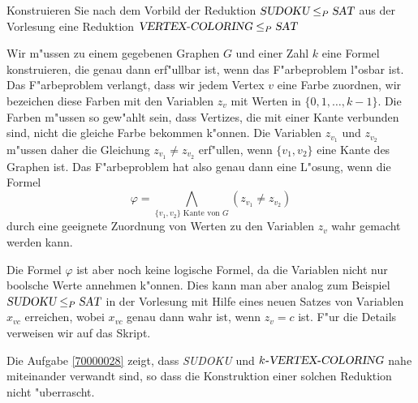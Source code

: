 Konstruieren Sie nach dem Vorbild der Reduktion
$\textsl{SUDOKU}\le_P\textsl{SAT}$ aus der Vorlesung eine
Reduktion
$\textsl{VERTEX-COLORING}\le_P\textsl{SAT}$

\begin{loesung}
Wir m"ussen zu einem gegebenen Graphen $G$ und einer Zahl $k$ eine
Formel konstruieren, die genau dann erf"ullbar ist, wenn das F"arbeproblem
l"osbar ist. Das F"arbeproblem verlangt, dass wir jedem Vertex $v$ eine
Farbe zuordnen, wir bezeichen diese Farben mit den Variablen $z_v$
mit Werten in $\{0,1,\dots,k-1\}$.
Die Farben m"ussen so gew"ahlt sein, dass Vertizes, die mit einer Kante
verbunden sind, nicht die gleiche Farbe bekommen k"onnen. Die Variablen
$z_{v_1}$ und $z_{v_2}$ m"ussen daher die Gleichung $z_{v_1}\ne z_{v_2}$
erf"ullen, wenn $\{v_1,v_2\}$ eine Kante des Graphen ist. Das F"arbeproblem
hat also genau dann eine L"osung, wenn die Formel
\[
\varphi =\bigwedge_{\text{$\{v_1,v_2\}$ Kante von $G$}} (z_{v_1}\ne z_{v_2})
\]
durch eine geeignete Zuordnung von Werten zu den Variablen $z_v$ wahr gemacht
werden kann.

Die Formel $\varphi$ ist aber noch keine logische Formel, da die Variablen
nicht nur boolsche Werte annehmen k"onnen.
Dies kann man aber analog zum Beispiel $\textsl{SUDOKU}\le_P\textsl{SAT}$
in der Vorlesung mit Hilfe eines neuen Satzes von Variablen $x_{vc}$
erreichen, wobei $x_{vc}$ genau dann wahr ist, wenn $z_v=c$ ist.
F"ur die Details verweisen wir auf das Skript.
\end{loesung}

\begin{diskussion}
Die Aufgabe \ref{70000028} zeigt, dass \textsl{SUDOKU} und 
$k\textsl{-VERTEX-COLORING}$ nahe miteinander verwandt sind,
so dass die Konstruktion einer solchen Reduktion nicht "uberrascht.
\end{diskussion}


